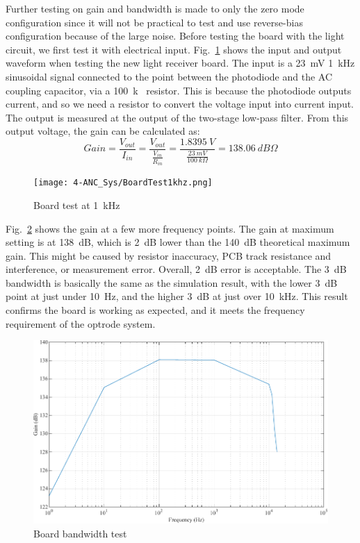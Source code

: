 Further testing on gain and bandwidth is made to only the zero mode configuration since it will not be practical to test and use reverse-bias configuration because of the large noise.  Before testing the board with the light circuit, we first test it with electrical input.  Fig.~\ref{fig_BoardTest1khz} shows the input and output waveform when testing the new light receiver board.  The input is a \qty{23}{mV} \qty{1}{kHz} sinusoidal signal connected to the point between the photodiode and the AC coupling capacitor, via a \qty{100}{k\Omega} resistor.  This is because the photodiode outputs current, and so we need a resistor to convert the voltage input into current input.  The output is measured at the output of the two-stage low-pass filter.  From this output voltage, the gain can be calculated as:
$$Gain=\frac{V_{out}}{I_{in}}=\frac{V_{out}}{\frac{V_{in}}{R_{in}}}=\frac{\qty{1.8395}{V}}{\frac{\qty{23}{mV}}{\qty{100}{k\Omega}}}=\qty{138.06}{dB\Omega}$$

\begin{figure}[H]
\centering
\texttt{[image: 4-ANC\_Sys/BoardTest1khz.png]}
\caption{Board test at \qty{1}{kHz}}
\label{fig_BoardTest1khz}
\end{figure}

Fig.~\ref{fig_BoardBandwidth} shows the gain at a few more frequency points.  The gain at maximum setting is at \qty{138}{dB}, which is \qty{2}{dB} lower than the \qty{140}{dB} theoretical maximum gain.  This might be caused by resistor inaccuracy, PCB track resistance and interference, or measurement error.  Overall, \qty{2}{dB} error is acceptable.  The \qty{3}{dB} bandwidth is basically the same as the simulation result, with the lower \qty{3}{dB} point at just under \qty{10}{Hz}, and the higher \qty{3}{dB} at just over \qty{10}{kHz}.  This result confirms the board is working as expected, and it meets the frequency requirement of the optrode system.

\begin{figure}[H]
\centering
\includegraphics[width=1\linewidth]{4-ANC_Sys/BoardBandwidth.pdf}
\caption{Board bandwidth test}
\label{fig_BoardBandwidth}
\end{figure}




